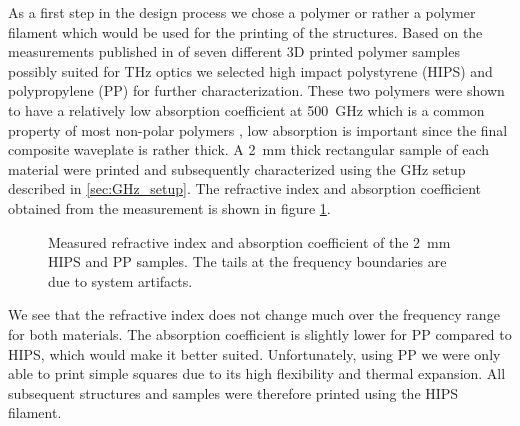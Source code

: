As a first step in the design process we chose a polymer or rather a polymer filament which would be used for the printing of the structures. Based on the measurements published in \cite{Busch2014} of seven different 3D printed polymer samples possibly suited for THz optics we selected high impact polystyrene (HIPS) and polypropylene (PP) for further characterization. These two polymers were shown to have a relatively low absorption coefficient at \SI{500}{\giga \hertz} which is a common property of most non-polar polymers \cite{Jordens2010, Castro-Camus2020}, low absorption is important since the final composite waveplate is rather thick. A \SI{2}{\milli \meter} thick rectangular sample of each material were printed and subsequently characterized using the GHz setup described in \ref{sec:GHz_setup}. The refractive index and absorption coefficient obtained from the measurement is shown in figure \ref{fig:HIPS_PP_ri}.

\begin{figure}[H]
    \centering
    
    \caption{Measured refractive index and absorption coefficient of the \SI{2}{\milli \meter} HIPS and PP samples. The tails at the frequency boundaries are due to system artifacts.}
    \label{fig:HIPS_PP_ri}
\end{figure}

 We see that the refractive index does not change much over the frequency range for both materials. The absorption coefficient is slightly lower for PP compared to HIPS, which would make it better suited. Unfortunately, using PP we were only able to print simple squares due to its high flexibility and thermal expansion. All subsequent structures and samples were therefore printed using the HIPS filament.

